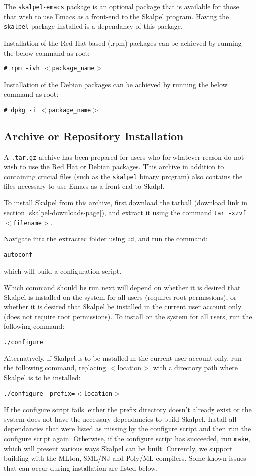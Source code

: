 \documentclass{report}
\begin{document}
The \texttt{skalpel-emacs} package is an optional package that is
available for those that wish to use Emacs as a front-end to the
Skalpel program. Having the \texttt{skalpel} package installed is a
dependancy of this package.

Installation of the Red Hat based (.rpm) packages can be achieved by
running the below command as root:

\texttt{\# rpm -ivh $<$package\_name$>$}

Installation of the Debian packages can be achieved by running the
below command as root:

\texttt{\# dpkg -i $<$package\_name$>$}

\subsection {Archive or Repository Installation}
\label{archive-installation}

A \texttt{.tar.gz} archive has been prepared for users who for
whatever reason do not wish to use the Red Hat or Debian
packages. This archive in addition to containing crucial files (such
as the \texttt{skalpel} binary program) also contains the files
necessary to use Emacs as a front-end to Skalpl.

To install Skalpel from this archive, first download the tarball
(download link in section \ref{skalpel-downloads-page}), and extract
it using the command \texttt{tar -xzvf $<$filename$>$}.

Navigate into the extracted folder using \texttt{cd}, and run the command:

\texttt{autoconf}

\noindent which will build a configuration script.

Which command should be run next will depend on whether it is desired
that Skalpel is installed on the system for all users (requires root
permissions), or whether it is desired that Skalpel be installed in the
current user account only (does not require root permissions). To
install on the system for all users, run the following command:

\texttt{./configure}

Alternatively, if Skalpel is to be installed in the current user
account only, run the following command, replacing
$<$location$>$ with a directory path where Skalpel is to be installed:

\texttt{./configure --prefix=$<$location$>$}

If the configure script fails, either the prefix directory doesn't
already exist or the system does not have the necessary dependancies
to build Skalpel. Install all dependancies that were listed as missing
by the configure script and then run the configure script
again. Otherwise, if the configure script has succeeded, run
\texttt{make}, which will present various ways Skalpel can be
built. Currently, we support building with the MLton, SML/NJ and
Poly/ML compilers. Some known issues that can occur during
installation are listed below.
\end{document}
